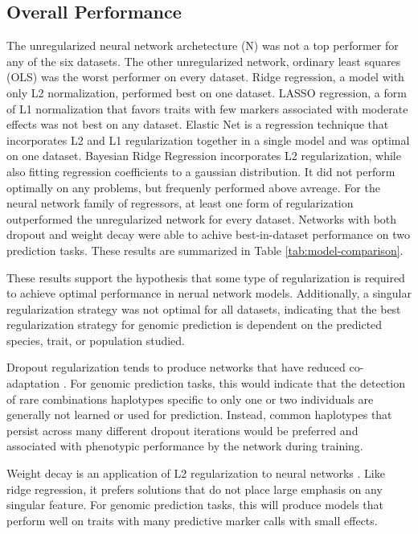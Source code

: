 
\subsection*{Overall Performance}

The unregularized neural network archetecture (N) was not a top performer for 
any of the six datasets. The other unregularized network, ordinary least 
squares (OLS) was the worst performer on every dataset. Ridge regression, 
a model with only L2 normalization, performed best on one dataset. 
LASSO regression, a form of L1 normalization that favors traits with few 
markers associated with moderate effects was not best on any dataset. 
Elastic Net is a regression technique that incorporates L2 and L1 
regularization together in a single model and was optimal on one dataset. 
Bayesian Ridge Regression incorporates L2 regularization, while also fitting 
regression coefficients to a gaussian distribution. It did not perform optimally 
on any problems, but frequenly performed above avreage. For the neural network family of 
regressors, at least one form of regularization outperformed the unregularized 
network for every dataset. Networks with both dropout and weight decay were 
able to achive best-in-dataset performance on two prediction tasks. These results are summarized 
in Table \ref{tab:model-comparison}.

These results support the hypothesis that some type of regularization is required to achieve
optimal performance in nerual network models. Additionally, a singular regularization strategy was
not optimal for all datasets, indicating that the best regularization strategy for genomic prediction
is dependent on the predicted species, trait, or population studied. 

Dropout regularization tends to produce networks 
that have reduced co-adaptation \citep{srivastava2014}. For genomic prediction tasks, this would
indicate that the detection of rare combinations haplotypes specific to only one
or two individuals are generally not learned or used for prediction. Instead, common haplotypes that persist across many
different dropout iterations would be preferred and associated with phenotypic performance by the network during training.

Weight decay is an application of L2 regularization to neural networks \citep{krogh1992}. Like ridge regression, it prefers
solutions that do not place large emphasis on any singular feature. For genomic prediction tasks, 
this will produce models that perform well on traits with many predictive marker calls 
with small effects. 

